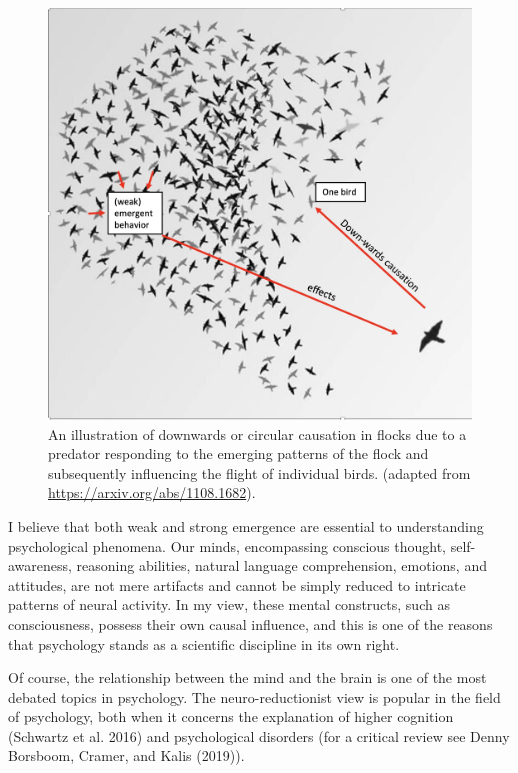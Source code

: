 \documentclass[
  a4paper,
  DIV=11,
  numbers=noendperiod]{scrreprt}
\begin{document}
\begin{figure}

{\centering \includegraphics{media/ch1/image4.jpg}

}

\caption{\label{fig-ch1-img4}An illustration of downwards or circular
causation in flocks due to a predator responding to the emerging
patterns of the flock and subsequently influencing the flight of
individual birds. (adapted from \url{https://arxiv.org/abs/1108.1682}).}

\end{figure}

I believe that both weak and strong emergence are essential to
understanding psychological phenomena. Our minds, encompassing conscious
thought, self-awareness, reasoning abilities, natural language
comprehension, emotions, and attitudes, are not mere artifacts and
cannot be simply reduced to intricate patterns of neural activity. In my
view, these mental constructs, such as consciousness, possess their own
causal influence, and this is one of the reasons that psychology stands
as a scientific discipline in its own right.

Of course, the relationship between the mind and the brain is one of the
most debated topics in psychology. The neuro-reductionist view is
popular in the field of psychology, both when it concerns the
explanation of higher cognition (Schwartz et al. 2016) and psychological
disorders (for a critical review see Denny Borsboom, Cramer, and Kalis
(2019)).
\end{document}
